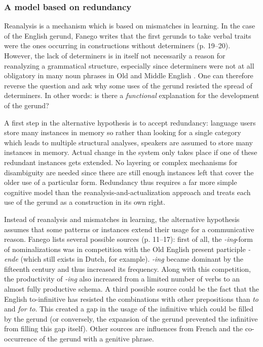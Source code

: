 \subsubsection{A model based on  redundancy} 
Reanalysis is a mechanism which is based on mismatches in learning. In the case of the English gerund, Fanego writes that the first gerunds to take verbal traits were the ones occurring in constructions without determiners (p. 19--20). However, the lack of determiners is in itself not necessarily a reason for reanalyzing a grammatical structure, especially since determiners were not at all obligatory in many noun phrases in Old and Middle English \citep[172--174]{traugott92syntax}. One can therefore reverse the question and ask why some uses of the gerund resisted the spread of determiners. In other words: is there a {\em functional} explanation for the development of the gerund?

A first step in the alternative hypothesis is to accept  redundancy: language users store many instances in memory so rather than looking for a single category which leads to multiple structural analyses, speakers are assumed to store many instances in memory. Actual change in the system only takes place if one of these redundant instances gets extended. No layering or complex mechanisms for disambiguity are needed since there are still enough instances left that cover the older use of a particular form. Redundancy thus requires a far more simple cognitive model than the reanalysis-and-actualization approach and treats each use of the gerund as a construction in its own right.

Instead of reanalysis and mismatches in learning, the alternative hypothesis assumes that some patterns or instances extend their usage for a communicative reason. Fanego lists several possible sources (p. 11--17): first of all, the {\em-ing}-form of nominalizations was in competition with the Old English present participle {\em -ende} (which still exists in Dutch, for example). {\em -ing} became dominant by the fifteenth century and thus increased its frequency. Along with this competition, the productivity of {\em -ing} also increased from a limited number of verbs to an almost fully productive schema. A third possible source could be the fact that the English  to-infinitive has resisted the combinations with other prepositions than {\em to} and {\em for to}. This created a gap in the usage of the infinitive which could be filled by the gerund (or conversely, the expansion of the gerund prevented the infinitive from filling this gap itself). Other sources are influences from French and the co-occurrence of the gerund with a genitive phrase.

